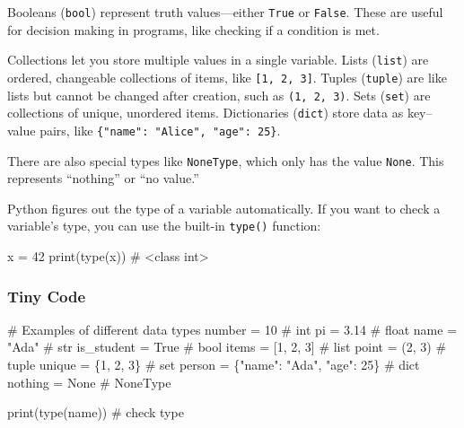 \documentclass[
  letterpaper,
  DIV=11,
  numbers=noendperiod]{scrreprt}
\newenvironment{Shaded}{\begin{snugshade}}{\end{snugshade}}
\newcommand{\BuiltInTok}[1]{\textcolor[rgb]{0.00,0.23,0.31}{#1}}
\newcommand{\CommentTok}[1]{\textcolor[rgb]{0.37,0.37,0.37}{#1}}
\newcommand{\DecValTok}[1]{\textcolor[rgb]{0.68,0.00,0.00}{#1}}
\newcommand{\FloatTok}[1]{\textcolor[rgb]{0.68,0.00,0.00}{#1}}
\newcommand{\NormalTok}[1]{\textcolor[rgb]{0.00,0.23,0.31}{#1}}
\newcommand{\OperatorTok}[1]{\textcolor[rgb]{0.37,0.37,0.37}{#1}}
\newcommand{\StringTok}[1]{\textcolor[rgb]{0.13,0.47,0.30}{#1}}
\newcommand{\VariableTok}[1]{\textcolor[rgb]{0.07,0.07,0.07}{#1}}
\begin{document}
Booleans (\texttt{bool}) represent truth values---either \texttt{True}
or \texttt{False}. These are useful for decision making in programs,
like checking if a condition is met.

Collections let you store multiple values in a single variable. Lists
(\texttt{list}) are ordered, changeable collections of items, like
\texttt{{[}1,\ 2,\ 3{]}}. Tuples (\texttt{tuple}) are like lists but
cannot be changed after creation, such as \texttt{(1,\ 2,\ 3)}. Sets
(\texttt{set}) are collections of unique, unordered items. Dictionaries
(\texttt{dict}) store data as key--value pairs, like
\texttt{\{"name":\ "Alice",\ "age":\ 25\}}.

There are also special types like \texttt{NoneType}, which only has the
value \texttt{None}. This represents ``nothing'' or ``no value.''

Python figures out the type of a variable automatically. If you want to
check a variable's type, you can use the built-in \texttt{type()}
function:

\begin{Shaded}
\begin{Highlighting}[]
\NormalTok{x }\OperatorTok{=} \DecValTok{42}
\BuiltInTok{print}\NormalTok{(}\BuiltInTok{type}\NormalTok{(x))  }\CommentTok{\# \textless{}class \textquotesingle{}int\textquotesingle{}\textgreater{}}
\end{Highlighting}
\end{Shaded}

\subsubsection{Tiny Code}\label{tiny-code-5}

\begin{Shaded}
\begin{Highlighting}[]
\CommentTok{\# Examples of different data types}
\NormalTok{number }\OperatorTok{=} \DecValTok{10}          \CommentTok{\# int}
\NormalTok{pi }\OperatorTok{=} \FloatTok{3.14}            \CommentTok{\# float}
\NormalTok{name }\OperatorTok{=} \StringTok{"Ada"}         \CommentTok{\# str}
\NormalTok{is\_student }\OperatorTok{=} \VariableTok{True}    \CommentTok{\# bool}
\NormalTok{items }\OperatorTok{=}\NormalTok{ [}\DecValTok{1}\NormalTok{, }\DecValTok{2}\NormalTok{, }\DecValTok{3}\NormalTok{]    }\CommentTok{\# list}
\NormalTok{point }\OperatorTok{=}\NormalTok{ (}\DecValTok{2}\NormalTok{, }\DecValTok{3}\NormalTok{)       }\CommentTok{\# tuple}
\NormalTok{unique }\OperatorTok{=}\NormalTok{ \{}\DecValTok{1}\NormalTok{, }\DecValTok{2}\NormalTok{, }\DecValTok{3}\NormalTok{\}   }\CommentTok{\# set}
\NormalTok{person }\OperatorTok{=}\NormalTok{ \{}\StringTok{"name"}\NormalTok{: }\StringTok{"Ada"}\NormalTok{, }\StringTok{"age"}\NormalTok{: }\DecValTok{25}\NormalTok{\}  }\CommentTok{\# dict}
\NormalTok{nothing }\OperatorTok{=} \VariableTok{None}       \CommentTok{\# NoneType}

\BuiltInTok{print}\NormalTok{(}\BuiltInTok{type}\NormalTok{(name))    }\CommentTok{\# check type}
\end{Highlighting}
\end{Shaded}
\end{document}
